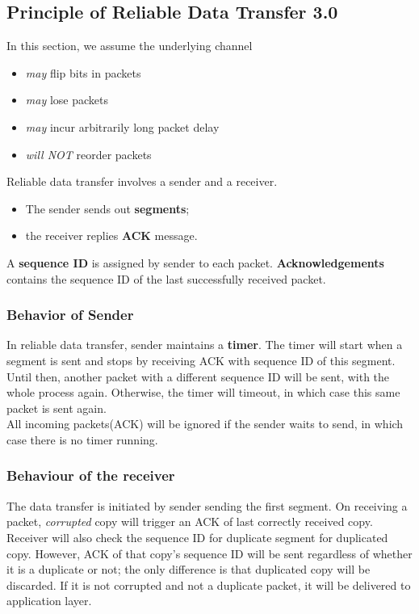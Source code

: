 \documentclass[12pt]{article}
\theoremstyle{definition}
\begin{document}
\subsection{Principle of Reliable Data Transfer 3.0}
In this section, we assume the underlying channel
\begin{itemize}
  \item \textit{may} flip bits in packets
  \item \textit{may} lose packets
  \item \textit{may} incur arbitrarily long packet delay
  \item \textit{will NOT} reorder packets
\end{itemize}
Reliable data transfer involves a sender and a receiver.
\begin{itemize}
\item The sender sends out \textbf{segments};
\item the receiver replies \textbf{ACK} message.
\end{itemize}
A \textbf{sequence ID} is assigned by sender to each packet. \textbf{Acknowledgements} contains the sequence ID of the last successfully received packet.\\ 
\subsubsection{Behavior of Sender}
In reliable data transfer, sender maintains a \textbf{timer}. The timer will start when a segment is sent and stops by receiving ACK with sequence ID of this segment. Until then, another packet with a different sequence ID will be sent, with the whole process again. Otherwise, the timer will timeout, in which case this same packet is sent again.\\All incoming packets(ACK) will be ignored if the sender waits to send, in which case there is no timer running.
\subsubsection{Behaviour of the receiver}
The data transfer is initiated by sender sending the first segment. On receiving a packet, \textit{corrupted} copy will trigger an ACK of last correctly received copy. Receiver will also check the sequence ID for duplicate segment for duplicated copy. However, ACK of that copy's sequence ID will be sent regardless of whether it is a duplicate or not; the only difference is that duplicated copy will be discarded. If it is not corrupted and not a duplicate packet, it will be delivered to application layer.
\end{document}
